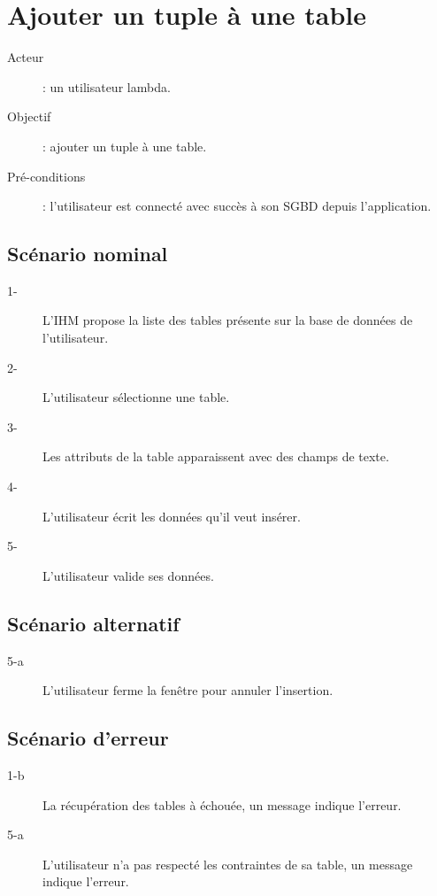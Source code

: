 \documentclass[a4paper, 12pt]{article}
\begin{document}
\section{Ajouter un tuple à une table}
\begin{description}
\item[Acteur] : un utilisateur lambda.
\item[Objectif] : ajouter un tuple à une table.
\item[Pré-conditions] : l'utilisateur est connecté avec succès à son SGBD depuis l'application.
\end{description}

\subsection{Scénario nominal}
\begin{description}
\item[1-] L'IHM propose la liste des tables présente sur la base de données de l'utilisateur.
\item[2-] L'utilisateur sélectionne une table.
\item[3-] Les attributs de la table apparaissent avec des champs de texte.
\item[4-] L'utilisateur écrit les données qu'il veut insérer.
\item[5-] L'utilisateur valide ses données.
\end{description}

\subsection{Scénario alternatif}
\begin{description}
\item[5-a] L'utilisateur ferme la fenêtre pour annuler l'insertion.
\end{description}

\subsection{Scénario d'erreur}
\begin{description}
\item[1-b] La récupération des tables à échouée, un message indique l'erreur.
\item[5-a] L'utilisateur n'a pas respecté les contraintes de sa table, un message indique l'erreur.
\end{description}
\end{document}
